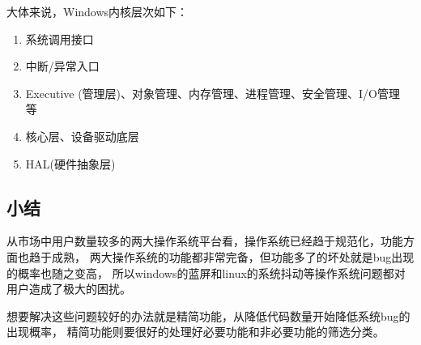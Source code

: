 大体来说，Windows内核层次如下：
\begin{enumerate}
  \item 系统调用接口
  \item 中断/异常入口
  \item Executive (管理层)、对象管理、内存管理、进程管理、安全管理、I/O管理等~\cite{毛德操2005windows}
  \item 核心层、设备驱动底层
  \item HAL(硬件抽象层)
\end{enumerate}

\subsection{小结}
从市场中用户数量较多的两大操作系统平台看，操作系统已经趋于规范化，功能方面也趋于成熟，
两大操作系统的功能都非常完备，但功能多了的坏处就是bug出现的概率也随之变高，
所以windows的蓝屏和linux的系统抖动等操作系统问题都对用户造成了极大的困扰。

想要解决这些问题较好的办法就是精简功能，从降低代码数量开始降低系统bug的出现概率，
精简功能则要很好的处理好必要功能和非必要功能的筛选分类。